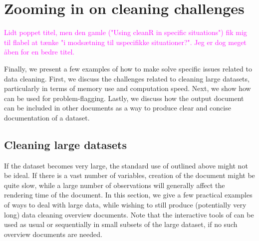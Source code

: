 \documentclass[article,shortnames]{jss}
\newcommand{\hl}[1]{\textcolor{magenta}{#1}}
\newcommand{\R}[1]{\code{#1}}
\begin{document}
\section{Zooming in on cleaning challenges}
\label{sec:specificExamples}
\hl{Lidt poppet titel, men den gamle ("Using cleanR in specific situations")
fik mig til flabel at tænke "i modsætning til uspecifikke situationer?". Jeg 
er dog meget åben for en bedre titel.}

Finally, we present a few examples of how to make 
solve specific issues related to data cleaning. First, we discuss the
challenges related to cleaning large datasets, particularly in terms
of memory use and computation speed. Next, we show how 
can be used for problem-flagging. Lastly, we discuss how the
 output document can be included in other 
documents as a way to produce clear and concise documentation of a
dataset. %

\subsection{Cleaning large datasets}
If the dataset becomes very large, the standard use of \R{clean()}
outlined above might not be ideal. If there is a vast number of
variables, creation of the  document might be quite
slow, while a large number of observations will generally affect the
rendering time of the document. In this section, we give a few
practical examples of ways to deal with large data, while wishing to
still produce (potentially very long) data cleaning overview
documents. Note that the interactive tools of  can be used
as usual or sequentially in small subsets of the large dataset, if no
such overview documents are needed.
\end{document}
